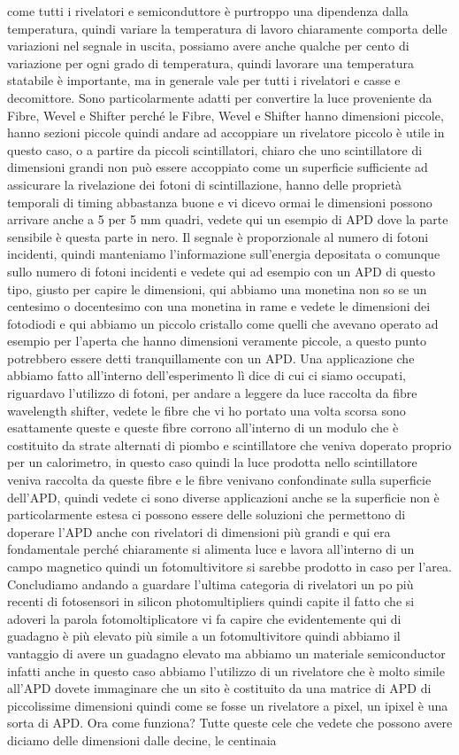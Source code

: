 come tutti i rivelatori e semiconduttore è purtroppo una dipendenza dalla temperatura, quindi variare la temperatura di lavoro chiaramente comporta delle variazioni nel segnale in uscita, possiamo avere anche qualche per cento di variazione per ogni grado di temperatura, quindi lavorare una temperatura statabile è importante, ma in generale vale per tutti i rivelatori e casse e decomittore. Sono particolarmente adatti per convertire la luce proveniente da Fibre, Wevel e Shifter perché le Fibre, Wevel e Shifter hanno dimensioni piccole, hanno sezioni piccole quindi andare ad accoppiare un rivelatore piccolo è utile in questo caso, o a partire da piccoli scintillatori, chiaro che uno scintillatore di dimensioni grandi non può essere accoppiato come un superficie sufficiente ad assicurare la rivelazione dei fotoni di scintillazione, hanno delle proprietà temporali di timing abbastanza buone e vi dicevo ormai le dimensioni possono arrivare anche a 5 per 5 mm quadri, vedete qui un esempio di APD dove la parte sensibile è questa parte in nero. Il segnale è proporzionale al numero di fotoni incidenti, quindi manteniamo l'informazione sull'energia depositata o comunque sullo numero di fotoni incidenti e vedete qui ad esempio con un APD di questo tipo, giusto per capire le dimensioni, qui abbiamo una monetina non so se un centesimo o docentesimo con una monetina in rame e vedete le dimensioni dei fotodiodi e qui abbiamo un piccolo cristallo come quelli che avevano operato ad esempio per l'aperta che hanno dimensioni veramente piccole, a questo punto potrebbero essere detti tranquillamente con un APD. Una applicazione che abbiamo fatto all'interno dell'esperimento lì dice di cui ci siamo occupati, riguardavo l'utilizzo di fotoni, per andare a leggere da luce raccolta da fibre wavelength shifter, vedete le fibre che vi ho portato una volta scorsa sono esattamente queste e queste fibre corrono all'interno di un modulo che è costituito da strate alternati di piombo e scintillatore che veniva doperato proprio per un calorimetro, in questo caso quindi la luce prodotta nello scintillatore veniva raccolta da queste fibre e le fibre venivano confondinate sulla superficie dell'APD, quindi vedete ci sono diverse applicazioni anche se la superficie non è particolarmente estesa ci possono essere delle soluzioni che permettono di doperare l'APD anche con rivelatori di dimensioni più grandi e qui era fondamentale perché chiaramente si alimenta luce e lavora all'interno di un campo magnetico quindi un fotomultivitore si sarebbe prodotto in caso per l'area. Concludiamo andando a guardare l'ultima categoria di rivelatori un po più recenti di fotosensori in silicon photomultipliers quindi capite il fatto che si adoveri la parola fotomoltiplicatore vi fa capire che evidentemente qui di guadagno è più elevato più simile a un fotomultivitore quindi abbiamo il vantaggio di avere un guadagno elevato ma abbiamo un materiale semiconductor infatti anche in questo caso abbiamo l'utilizzo di un rivelatore che è molto simile all'APD dovete immaginare che un sito è costituito da una matrice di APD di piccolissime dimensioni quindi come se fosse un rivelatore a pixel, un ipixel è una sorta di APD. Ora come funziona? Tutte queste cele che vedete che possono avere diciamo delle dimensioni dalle decine, le centinaia 